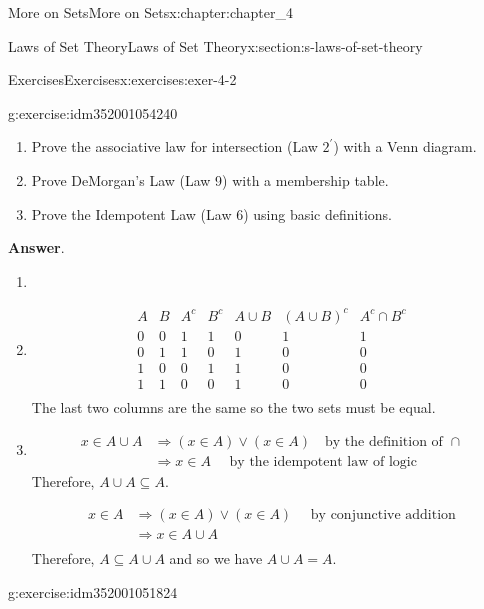 \documentclass[oneside,10pt,]{book}
\newcommand{\blocktitlefont}{\relax}
\begin{document}
\begin{chapterptx}{More on Sets}{}{More on Sets}{}{}{x:chapter:chapter_4}
\begin{sectionptx}{Laws of Set Theory}{}{Laws of Set Theory}{}{}{x:section:s-laws-of-set-theory}
\begin{exercises-subsection}{Exercises}{}{Exercises}{}{}{x:exercises:exer-4-2}
\begin{divisionexercise}{1}{}{}{g:exercise:idm352001054240}
\begin{enumerate}[label=(\alph*)]
\item{}Prove the associative law for intersection (Law \(2^{\prime}\)) with a Venn diagram.%
\item{}Prove DeMorgan's Law (Law 9) with a membership table.%
\item{}Prove the Idempotent Law (Law 6) using basic definitions.%
\end{enumerate}
%
\par\smallskip%
\noindent\textbf{\blocktitlefont Answer}.\hypertarget{g:answer:idm352001054112}{}\quad{}%
\begin{enumerate}[label=(\alph*)]
\item{}%
\item{}%
\begin{equation*}
\begin{array}{ccccccc}
A & B &A^c & B^c & A\cup B & (A\cup B)^c &A^c\cap B^c \\
\hline
0 & 0 &1 &  1 &  0 &  1 &  1 \\
0 & 1 &1 &  0 &  1 &  0 &  0 \\
1 & 0 & 0 &  1 &  1 &  0 &  0 \\
1 & 1 & 0 &  0 &  1 &  0 &  0 \\
\end{array}
\end{equation*}
The last two columns are the same so the two sets must be equal.%
\item{}%
\begin{equation*}
\begin{split}
x\in A\cup A & \Rightarrow  (x\in A) \lor (x\in A)\quad\textrm{by the definition of } \cap\\
&\Rightarrow x\in A \quad\textrm{ by the idempotent law of logic}
\end{split}
\end{equation*}
Therefore, \(A\cup A\subseteq A\).%
\par
%
\begin{equation*}
\begin{split}
x\in A &\Rightarrow (x\in A) \lor (x\in A) \quad \textrm{ by conjunctive addition}\\
& \Rightarrow  x\in A\cup A\\
\end{split}
\end{equation*}
Therefore, \(A \subseteq A\cup A\) and so we have \(A\cup A=A\).%
\end{enumerate}
%
\end{divisionexercise}%
\begin{divisionexercise}{2}{}{}{g:exercise:idm352001051824}%

\end{divisionexercise}
\end{exercises-subsection}
\end{sectionptx}
\end{chapterptx}
\end{document}
